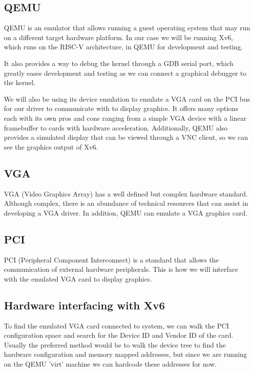 \subsection{QEMU}
QEMU is an emulator that allows running a guest operating system that may run on
a different target hardware platform. In our case we will be running Xv6,
which runs on the RISC-V architecture, in QEMU for development and testing.


It also provides a way to debug the kernel through a GDB serial port, which greatly
eases development and testing as we can connect a graphical debugger to the kernel.


We will also be using its device emulation to emulate a VGA card on the PCI bus 
for our driver to communicate with to display graphics. It offers many options 
each with its own pros and cons ranging from a simple VGA device with a linear framebuffer
to cards with hardware acceleration. Additionally, QEMU also
provides a simulated display that can be viewed through a VNC client, so we can
see the graphics output of Xv6.

\subsection{VGA}
VGA (Video Graphics Array) has a well defined but complex hardware standard.
Although complex, there is an abundance of technical resources
\cite{vgamanual}
\cite{osdevvga}
\cite{freevga}
that can
assist in developing a VGA driver. In addition, QEMU can emulate a VGA
graphics card.

\subsection{PCI}
PCI (Peripheral Component Interconnect) is a standard that allows the communication of external hardware peripherals. 
This is how we will interface with the emulated VGA card to display graphics.

\subsection{Hardware interfacing with Xv6}
\label{chapter1:research:hardware}
To find the emulated VGA card connected to system, we can walk the PCI
configuration space and search for the Device ID and Vendor ID of the card.
Usually the preferred method would be to walk the device tree \cite{devicetree} to find
the hardware configuration and memory mapped addresses, but since we are running
on the QEMU 'virt' machine we can hardcode these addresses for now.

